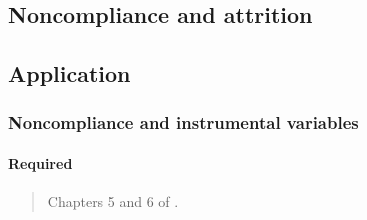 \documentclass[12pt]{article}
\begin{document}
\begin{verse}  \end{verse}

\begin{verse}  \end{verse}

\begin{verse}  \end{verse}

\begin{verse}  \end{verse}

\begin{verse}  \end{verse}

\begin{verse}  \end{verse}

\begin{verse}  \end{verse}

\begin{verse}  \end{verse}

\subsection{Noncompliance and attrition}

\subsection*{Application}

\begin{verse}  \end{verse}

\subsubsection{Noncompliance and instrumental variables}

\paragraph*{Required}

\begin{verse} Chapters 5 and 6 of . \end{verse}
\end{document}
